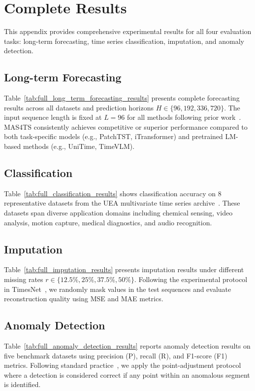 \section{Complete Results}
\label{appx:complete_results}

This appendix provides comprehensive experimental results for all four evaluation tasks: long-term forecasting, time series classification, imputation, and anomaly detection.

\subsection{Long-term Forecasting}
\label{appx:forecasting_results}



Table~\ref{tab:full_long_term_forecasting_results} presents complete forecasting results across all datasets and prediction horizons $H \in \{96, 192, 336, 720\}$. The input sequence length is fixed at $L = 96$ for all methods following prior work~\citep{wu2022timesnet}. MAS4TS consistently achieves competitive or superior performance compared to both task-specific models (e.g., PatchTST, iTransformer) and pretrained LM-based methods (e.g., UniTime, TimeVLM).

\subsection{Classification}
\label{appx:classification_results}


Table~\ref{tab:full_classification_results} shows classification accuracy on 8 representative datasets from the UEA multivariate time series archive~\citep{bagnall2018uea}. These datasets span diverse application domains including chemical sensing, video analysis, motion capture, medical diagnostics, and audio recognition.

\subsection{Imputation}
\label{appx:imputation_results}


Table~\ref{tab:full_imputation_results} presents imputation results under different missing rates $r \in \{12.5\%, 25\%, 37.5\%, 50\%\}$. Following the experimental protocol in TimesNet~\citep{wu2023timesnet}, we randomly mask values in the test sequences and evaluate reconstruction quality using MSE and MAE metrics.

\subsection{Anomaly Detection}
\label{appx:anomaly_results}


Table~\ref{tab:full_anomaly_detection_results} reports anomaly detection results on five benchmark datasets using precision (P), recall (R), and F1-score (F1) metrics. Following standard practice~\citep{xu2021anomaly}, we apply the point-adjustment protocol where a detection is considered correct if any point within an anomalous segment is identified.